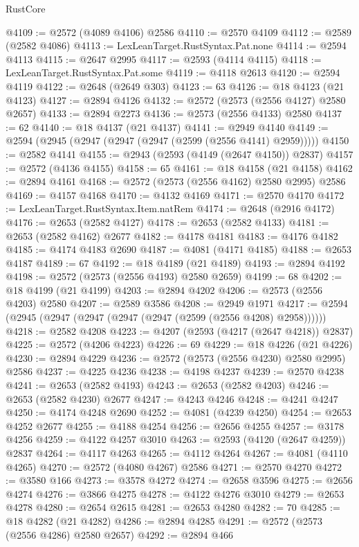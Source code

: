 \begin{lexlean}{RustCore}
\begin{coremodule}
@4109 := @2572 (@4089 @4106) @2586
@4110 := @2570 @4109
@4112 := @2589 (@2582 @4086)
@4113 := LexLeanTarget.RustSyntax.Pat.none
@4114 := @2594 @4113
@4115 := @2647 @2995
@4117 := @2593 (@4114 @4115)
@4118 := LexLeanTarget.RustSyntax.Pat.some
@4119 := @4118 @2613
@4120 := @2594 @4119
@4122 := @2648 (@2649 @303)
@4123 := 63
@4126 := @18 @4123 (@21 @4123)
@4127 := @2894 @4126
@4132 := @2572 (@2573 (@2556 @4127) @2580 @2657)
@4133 := @2894 @2273
@4136 := @2573 (@2556 @4133) @2580
@4137 := 62
@4140 := @18 @4137 (@21 @4137)
@4141 := @2949 @4140
@4149 := @2594 (@2945 (@2947 (@2947 (@2947 (@2599 (@2556 @4141) @2959)))))
@4150 := @2582 @4141
@4155 := @2943 (@2593 (@4149 (@2647 @4150)) @2837)
@4157 := @2572 (@4136 @4155)
@4158 := 65
@4161 := @18 @4158 (@21 @4158)
@4162 := @2894 @4161
@4168 := @2572 (@2573 (@2556 @4162) @2580 @2995) @2586
@4169 := @4157 @4168
@4170 := @4132 @4169
@4171 := @2570 @4170
@4172 := LexLeanTarget.RustSyntax.Item.natRem
@4174 := @2648 (@2916 @4172)
@4176 := @2653 (@2582 @4127)
@4178 := @2653 (@2582 @4133)
@4181 := @2653 (@2582 @4162) @2677
@4182 := @4178 @4181
@4183 := @4176 @4182
@4185 := @4174 @4183 @2690
@4187 := @4081 (@4171 @4185)
@4188 := @2653 @4187
@4189 := 67
@4192 := @18 @4189 (@21 @4189)
@4193 := @2894 @4192
@4198 := @2572 (@2573 (@2556 @4193) @2580 @2659)
@4199 := 68
@4202 := @18 @4199 (@21 @4199)
@4203 := @2894 @4202
@4206 := @2573 (@2556 @4203) @2580
@4207 := @2589 @3586
@4208 := @2949 @1971
@4217 := @2594 (@2945 (@2947 (@2947 (@2947 (@2947 (@2599 (@2556 @4208) @2958))))))
@4218 := @2582 @4208
@4223 := @4207 (@2593 (@4217 (@2647 @4218)) @2837)
@4225 := @2572 (@4206 @4223)
@4226 := 69
@4229 := @18 @4226 (@21 @4226)
@4230 := @2894 @4229
@4236 := @2572 (@2573 (@2556 @4230) @2580 @2995) @2586
@4237 := @4225 @4236
@4238 := @4198 @4237
@4239 := @2570 @4238
@4241 := @2653 (@2582 @4193)
@4243 := @2653 (@2582 @4203)
@4246 := @2653 (@2582 @4230) @2677
@4247 := @4243 @4246
@4248 := @4241 @4247
@4250 := @4174 @4248 @2690
@4252 := @4081 (@4239 @4250)
@4254 := @2653 @4252 @2677
@4255 := @4188 @4254
@4256 := @2656 @4255
@4257 := @3178 @4256
@4259 := @4122 @4257 @3010
@4263 := @2593 (@4120 (@2647 @4259)) @2837
@4264 := @4117 @4263
@4265 := @4112 @4264
@4267 := @4081 (@4110 @4265)
@4270 := @2572 (@4080 @4267) @2586
@4271 := @2570 @4270
@4272 := @3580 @166
@4273 := @3578 @4272
@4274 := @2658 @3596
@4275 := @2656 @4274
@4276 := @3866 @4275
@4278 := @4122 @4276 @3010
@4279 := @2653 @4278
@4280 := @2654 @2615
@4281 := @2653 @4280
@4282 := 70
@4285 := @18 @4282 (@21 @4282)
@4286 := @2894 @4285
@4291 := @2572 (@2573 (@2556 @4286) @2580 @2657)
@4292 := @2894 @466

\end{coremodule}
\end{lexlean}
